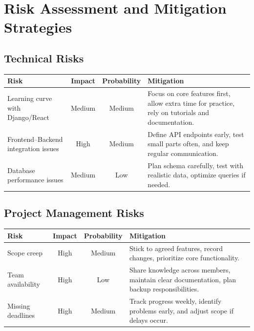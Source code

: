 \documentclass[12pt,a4paper]{article}
\newcommand{\sectionbreak}{\vspace{0.5cm}}
\begin{document}

\sectionbreak

\section{Risk Assessment and Mitigation Strategies}

\subsection{Technical Risks}
\begin{tabularx}{\textwidth}{|X|c|c|X|}
\hline
\textbf{Risk} & \textbf{Impact} & \textbf{Probability} & \textbf{Mitigation} \\
\hline
Learning curve with Django/React & Medium & Medium & Focus on core features first, allow extra time for practice, rely on tutorials and documentation. \\
\hline
Frontend--Backend integration issues & High & Medium & Define API endpoints early, test small parts often, and keep regular communication. \\
\hline
Database performance issues & Medium & Low & Plan schema carefully, test with realistic data, optimize queries if needed. \\
\hline
\end{tabularx}

\subsection{Project Management Risks}
\begin{tabularx}{\textwidth}{|X|c|c|X|}
\hline
\textbf{Risk} & \textbf{Impact} & \textbf{Probability} & \textbf{Mitigation} \\
\hline
Scope creep & High & Medium & Stick to agreed features, record changes, prioritize core functionality. \\
\hline
Team availability & High & Low & Share knowledge across members, maintain clear documentation, plan backup responsibilities. \\
\hline
Missing deadlines & High & Medium & Track progress weekly, identify problems early, and adjust scope if delays occur. \\
\hline
\end{tabularx}
\end{document}
